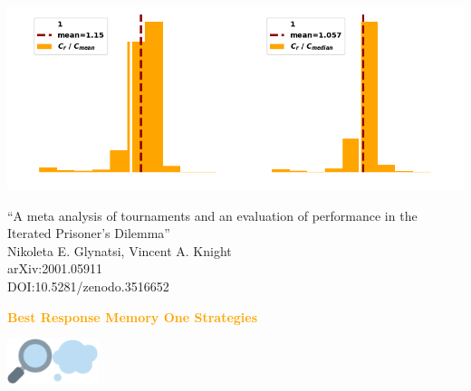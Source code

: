 \documentclass{beamer}
\begin{document}
\begin{frame}
    \begin{center}
        \includegraphics[width=.8\textwidth]{static/features.png}
    \end{center}
\end{frame}


\begin{frame}
    \begin{center}
        \large{``A meta analysis of tournaments and an evaluation of performance in the Iterated Prisoner's Dilemma''} \\ \vspace{.5cm}
        \footnotesize{Nikoleta E. Glynatsi, Vincent A. Knight} \\ \vspace{.5cm}
        \footnotesize{arXiv:2001.05911} \\ \vspace{.5cm}
        \footnotesize{DOI:10.5281/zenodo.3516652}
    \end{center}
\end{frame}

\begin{frame}
    \begin{center}
    \textcolor{orange}{\large{\textbf{Best Response Memory One Strategies}}} \vspace{1cm}

    \includegraphics[width=0.10\textwidth]{static/look.png}\hspace{2pt}\includegraphics[width=0.10\textwidth]{static/memone.png}
    \end{center}
\end{frame}
\end{document}
